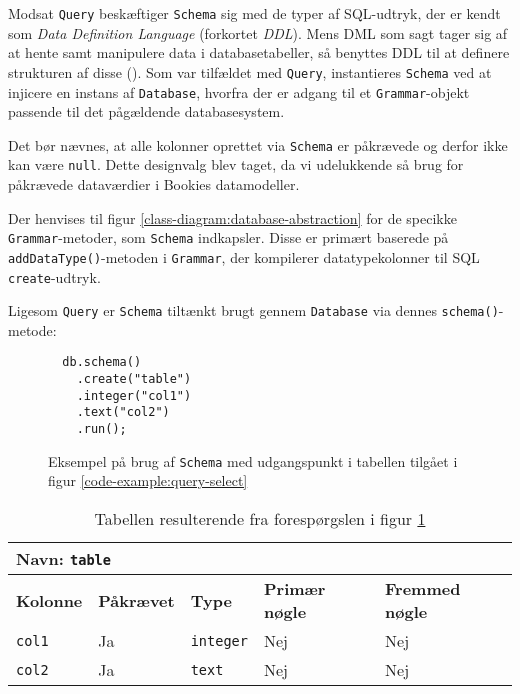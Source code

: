 Modsat \texttt{Query} beskæftiger \texttt{Schema} sig med de typer af SQL-udtryk, der er kendt som \textit{Data Definition Language} (forkortet \textit{DDL}). Mens DML som sagt tager sig af at hente samt manipulere data i databasetabeller, så benyttes DDL til at definere strukturen af disse (\cite{wiki:ddl}). Som var tilfældet med \texttt{Query}, instantieres \texttt{Schema} ved at injicere en instans af \texttt{Database}, hvorfra der er adgang til et \texttt{Grammar}-objekt passende til det pågældende databasesystem.

Det bør nævnes, at alle kolonner oprettet via \texttt{Schema} er påkrævede og derfor ikke kan være \texttt{null}. Dette designvalg blev taget, da vi udelukkende så brug for påkrævede dataværdier i Bookies datamodeller.

Der henvises til figur \ref{class-diagram:database-abstraction} for de specikke \texttt{Grammar}-metoder, som \texttt{Schema} indkapsler. Disse er primært baserede på \texttt{addDataType()}-metoden i \texttt{Grammar}, der kompilerer datatypekolonner til SQL \texttt{create}-udtryk.

Ligesom \texttt{Query} er \texttt{Schema} tiltænkt brugt gennem \texttt{Database} via dennes \texttt{schema()}-metode:

\begin{figure}[h]
  \begin{verbatim}
  db.schema()
    .create("table")
    .integer("col1")
    .text("col2")
    .run();
  \end{verbatim}
  \caption{Eksempel på brug af \texttt{Schema} med udgangspunkt i tabellen tilgået i figur \ref{code-example:query-select}}
  \label{code-example:schema-create}
\end{figure}

\begin{table}[h]
  \centering
  \begin{tabular}{l | l | l | l | l}

    \multicolumn{3}{l}{\textbf{Navn}: \texttt{table}} \\

    \hline

    \textbf{Kolonne} & \textbf{Påkrævet} & \textbf{Type} & \textbf{Primær nøgle} & \textbf{Fremmed nøgle} \\

    \hline

    \texttt{col1} & Ja & \texttt{integer} & Nej & Nej \\
    \texttt{col2} & Ja & \texttt{text} & Nej & Nej \\

    \hline

  \end{tabular}
  \caption{Tabellen resulterende fra forespørgslen i figur \ref{code-example:schema-create}}
\end{table}

